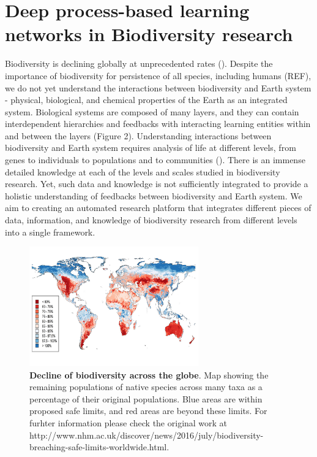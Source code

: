 \documentclass[authoryear,1p,12pt]{elsarticle}
\begin{document}
\pagebreak
\section*{Deep process-based learning networks in Biodiversity research}

\noindent Biodiversity is declining globally at unprecedented rates ().
Despite the importance of biodiversity for persistence of all species, including
humans (REF), we do not yet understand the interactions between biodiversity and 
Earth system - physical, biological, and chemical properties of the Earth as an
integrated system. Biological systems are composed of many layers, and they can
contain interdependent hierarchies and feedbacks with interacting
learning entities within and between the layers (Figure 2). Understanding interactions between biodiversity and Earth system requires analysis of life at different levels,
from genes to individuals to populations and to communities (). There is an immense
 detailed knowledge at each of the levels and scales studied in biodiversity
research. Yet, such data and knowledge is not sufficiently integrated to provide
 a holistic understanding of feedbacks between biodiversity and Earth system.
We aim to creating an automated research platform that integrates different pieces
of data, information, and knowledge of biodiversity research from different levels
into a single framework. %

\begin{figure}[htp]
  \centering
  \includegraphics[height=0.013\maxdimen, width=0.65\textwidth]{Figure1}
	\caption{
		\textbf{Decline of biodiversity across the globe}.
       Map showing the remaining populations of native
       species across many taxa as a percentage of their original
       populations. Blue areas are within proposed safe limits, and
       red areas are beyond these limits. For furhter information
       please check the original work at
       {http://www.nhm.ac.uk/discover/news/2016/july/biodiversity-breaching-safe-limits-worldwide.html}.
		}
	\label{fig:1}
\end{figure}
\end{document}
